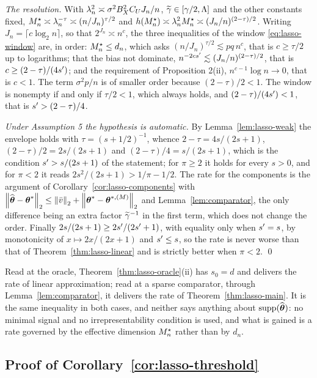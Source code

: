 \emph{The resolution.} With $\lambda_{n}^2 \asymp \sigma^2B_X^2C_UJ_n/n$,
$\widetilde{\gamma} \in [\gamma/2,\Lambda]$ and the other constants fixed,
$M^{\star}_n \asymp \lambda_{n}^{-\tau} \asymp (n/J_n)^{\tau/2}$ and
$h(M^{\star}_n) \asymp \lambda_{n}^2M^{\star}_n \asymp (J_n/n)^{(2-\tau)/2}$. Writing
$J_n = \lceil c\log_2 n\rceil$, so that $2^{J_n} \asymp n^{c}$, the three
inequalities of the window \eqref{eq:lasso-window} are, in order: $M^{\star}_n \le d_n$, which asks
$(n/J_n)^{\tau/2} \lesssim pq\,n^{c}$, that is $c \ge \tau/2$ up to
logarithms; that the bias not dominate, $n^{-2cs'} \lesssim
(J_n/n)^{(2-\tau)/2}$, that is $c \ge (2-\tau)/(4s')$; and the requirement
of Proposition 2(ii), $n^{c-1}\log n \to 0$, that is $c<1$. The term
$\sigma^2p/n$ is of smaller order because $(2-\tau)/2<1$. The window is
nonempty if and only if $\tau/2<1$, which always holds, and
$(2-\tau)/(4s')<1$, that is $s'>(2-\tau)/4$.

\emph{Under Assumption 5 the hypothesis is automatic.} By Lemma~\ref{lem:lasso-weak} the
envelope holds with $\tau = (s+1/2)^{-1}$, whence $2-\tau = 4s/(2s+1)$,
$(2-\tau)/2 = 2s/(2s+1)$ and $(2-\tau)/4 = s/(2s+1)$, which is the condition
$s'>s/(2s+1)$ of the statement; for $\pi \ge 2$ it holds for every $s>0$,
and for $\pi<2$ it reads $2s^2/(2s+1)>1/\pi-1/2$. The rate for the components
is the argument of Corollary~\ref{cor:lasso-components} with
$\left\lVert \widehat{\boldsymbol{\theta}}-\boldsymbol{\theta}^{*} \right\rVert_2 \le \left\lVert \bar v \right\rVert_2 +
\left\lVert \boldsymbol{\theta}^{*}-\boldsymbol{\theta}^{*,(M)} \right\rVert_2$ and Lemma~\ref{lem:comparator}, the only difference being an
extra factor $\widetilde{\gamma}^{-1}$ in the first term, which does not change the order.
Finally $2s/(2s+1) \ge 2s'/(2s'+1)$, with equality only when
$s' = s$, by monotonicity of $x \mapsto 2x/(2x+1)$ and $s' \le s$, so
the rate is never worse than that of Theorem~\ref{thm:lasso-linear} and is strictly better when
$\pi<2$. \qed

\begin{remark}
\label{rem:s0}
Read at the oracle, Theorem~\ref{thm:lasso-oracle}(ii) has $s_0 = d$ and delivers the rate of
linear approximation; read at a sparse comparator, through Lemma~\ref{lem:comparator}, it delivers the rate
of Theorem~\ref{thm:lasso-main}. It is the same inequality in both cases, and neither says
anything about $\operatorname{supp}(\widehat{\boldsymbol{\theta}})$: no minimal signal and no
irrepresentability condition is used, and what is gained is a rate governed by
the effective dimension $M^{\star}_n$ rather than by $d_n$.
\end{remark}

\subsection*{Proof of Corollary~\ref{cor:lasso-threshold}}

